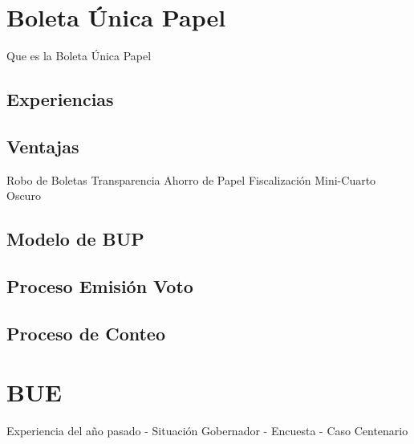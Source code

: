 \documentclass{llncs}
\begin{document}










\section{Boleta Única Papel}
Que es la Boleta Única Papel 

\subsection{Experiencias}

\subsection{Ventajas}
Robo de Boletas
Transparencia
Ahorro de Papel
Fiscalización
Mini-Cuarto Oscuro

\subsection{Modelo de BUP}

\subsection{Proceso Emisión Voto}

\subsection{Proceso de Conteo}

\section {BUE}
Experiencia del año pasado
- Situación Gobernador
- Encuesta
- Caso Centenario
\end{document}
